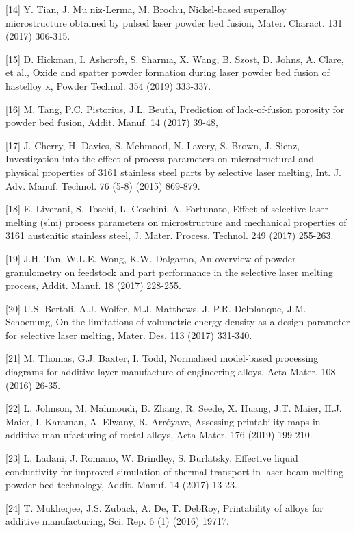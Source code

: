 \documentclass[10pt]{article}
\begin{document}
[14] Y. Tian, J. Mu niz-Lerma, M. Brochu, Nickel-based superalloy microstructure obtained by pulsed laser powder bed fusion, Mater. Charact. 131 (2017) 306-315.

[15] D. Hickman, I. Ashcroft, S. Sharma, X. Wang, B. Szost, D. Johns, A. Clare, et al., Oxide and spatter powder formation during laser powder bed fusion of hastelloy $\mathrm{x}$, Powder Technol. 354 (2019) 333-337.

[16] M. Tang, P.C. Pistorius, J.L. Beuth, Prediction of lack-of-fusion porosity for powder bed fusion, Addit. Manuf. 14 (2017) 39-48,

[17] J. Cherry, H. Davies, S. Mehmood, N. Lavery, S. Brown, J. Sienz, Investigation into the effect of process parameters on microstructural and physical properties of 3161 stainless steel parts by selective laser melting, Int. J. Adv. Manuf. Technol. 76 (5-8) (2015) 869-879.

[18] E. Liverani, S. Toschi, L. Ceschini, A. Fortunato, Effect of selective laser melting (slm) process parameters on microstructure and mechanical properties of 3161 austenitic stainless steel, J. Mater. Process. Technol. 249 (2017) 255-263.

[19] J.H. Tan, W.L.E. Wong, K.W. Dalgarno, An overview of powder granulometry on feedstock and part performance in the selective laser melting process, Addit. Manuf. 18 (2017) 228-255.

[20] U.S. Bertoli, A.J. Wolfer, M.J. Matthews, J.-P.R. Delplanque, J.M. Schoenung, On the limitations of volumetric energy density as a design parameter for selective laser melting, Mater. Des. 113 (2017) 331-340.

[21] M. Thomas, G.J. Baxter, I. Todd, Normalised model-based processing diagrams for additive layer manufacture of engineering alloys, Acta Mater. 108 (2016) 26-35.

[22] L. Johnson, M. Mahmoudi, B. Zhang, R. Seede, X. Huang, J.T. Maier, H.J. Maier, I. Karaman, A. Elwany, R. Arróyave, Assessing printability maps in additive man ufacturing of metal alloys, Acta Mater. 176 (2019) 199-210.

[23] L. Ladani, J. Romano, W. Brindley, S. Burlatsky, Effective liquid conductivity for improved simulation of thermal transport in laser beam melting powder bed technology, Addit. Manuf. 14 (2017) 13-23.

[24] T. Mukherjee, J.S. Zuback, A. De, T. DebRoy, Printability of alloys for additive manufacturing, Sci. Rep. 6 (1) (2016) 19717.
\end{document}
